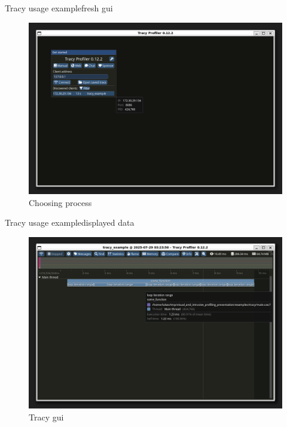 \documentclass[aspectratio=169]{beamer}
\begin{document}
\begin{frame}{Tracy usage example}{fresh gui}
    \begin{figure}[h]
        \centering
        \includegraphics[width=\textwidth,height=0.7\textheight,keepaspectratio]{pics/tracy/gui1.png}
        \caption{Choosing process}
    \end{figure}

\end{frame}

\begin{frame}{Tracy usage example}{displayed data}

    \begin{figure}[h]
        \centering
        \includegraphics[width=\textwidth,height=0.7\textheight,keepaspectratio]{pics/tracy/gui2.png}
        \caption{Tracy gui}
    \end{figure}

\end{frame}
\end{document}
